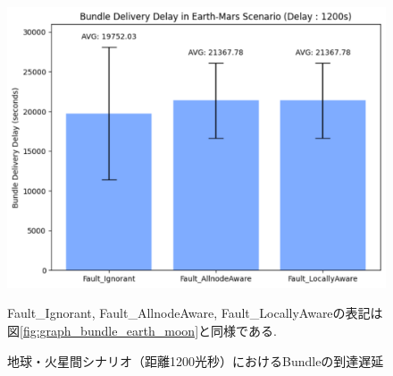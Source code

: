 \begin{figure}[tbh]
    \centering
    \includegraphics[width=0.7\textheight]{img/mars_1200_delay.pdf}
    \caption{地球・火星間シナリオ（距離1200光秒）におけるBundleの到達遅延}
    \label{fig:graph_delay_earth_mars_1200}
    \begin{minipage}{\textwidth}
        \centering
        \vspace{3mm}
        \fontsize{10.5pt}{12pt}\selectfont
        Fault\_Ignorant, Fault\_AllnodeAware, Fault\_LocallyAwareの表記は
        図\ref{fig:graph_bundle_earth_moon}と同様である.
    \end{minipage}
\end{figure}

